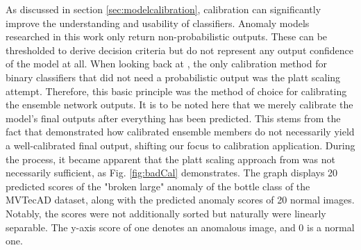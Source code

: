 As discussed in section \ref{sec:modelcalibration}, calibration can significantly improve the understanding and usability of classifiers. Anomaly models researched in this work only return non-probabilistic 
outputs. These can be thresholded to derive decision criteria but do not represent any output confidence of the model at all. When looking back at \cite{Guo_2017_tempscalingetc}, the only calibration 
method for binary classifiers that did not need a probabilistic output was the platt scaling attempt. Therefore, this basic principle was the method of choice for calibrating the ensemble network 
outputs. It is to be noted here that we merely calibrate the model's final outputs after everything has been predicted. This stems from the fact that \cite{Wu_2021_shouldbecalibrated} demonstrated 
how calibrated ensemble members do not necessarily yield a well-calibrated final output, shifting our focus to calibration application. During the process, it became apparent that the platt 
scaling approach from \cite{Guo_2017_tempscalingetc} was not necessarily sufficient, as Fig. \ref{fig:badCal} demonstrates. The graph displays 20 predicted scores of the "broken large" anomaly of the bottle class of the MVTecAD dataset, 
along with the predicted anomaly scores of 20 normal images. Notably, the scores were not additionally sorted but naturally 
were linearly separable. The y-axis score of one denotes an anomalous image, and 0 is a normal one.


